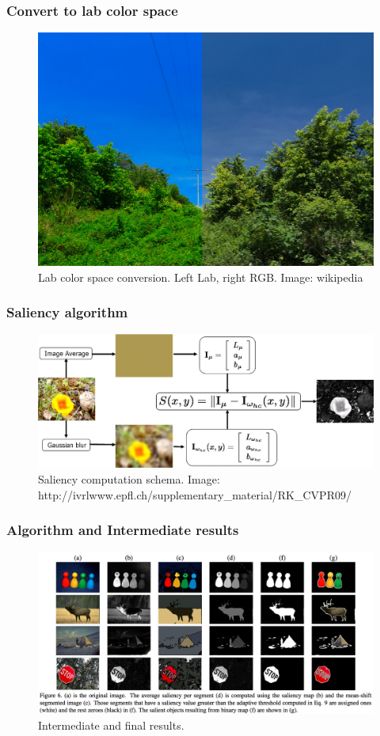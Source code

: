 \documentclass{beamer}
\begin{document}
\begin{frame}
    \frametitle{Convert to lab color space}
    \begin{figure}
        \includegraphics[width=.9\textwidth]{report-images/Example_of_LAB_color_enhancement.jpg}
        \caption{Lab color space conversion. Left Lab, right RGB\@. Image: wikipedia}
    \end{figure}
\end{frame}

\begin{frame}
    \frametitle{Saliency algorithm}
    \begin{figure}
        \includegraphics[width=.9\textwidth]{report-images/SaliencyAlgo.jpg}
        \caption{Saliency computation schema. Image: {http://ivrlwww.epfl.ch/supplementary\_material/RK\_CVPR09/}}
    \end{figure}
\end{frame}

\begin{frame}
    \frametitle{Algorithm and Intermediate results}
    \begin{figure}
        \includegraphics[width=.9\textwidth]{report-images/intermediate_results.png}
        \caption{Intermediate and final results\cite{achanta}.}
    \end{figure}
\end{frame}
\end{document}
